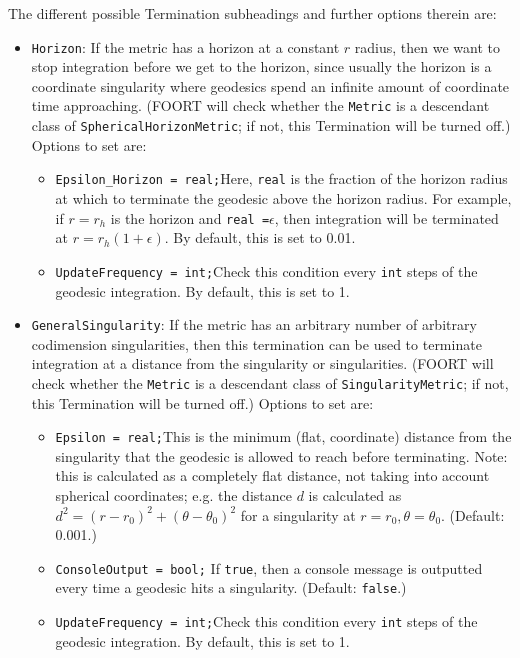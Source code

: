 \documentclass[11pt,a4paper]{article}
\newcommand{\code}[1]{{\tt #1}}
\begin{document}
The different possible Termination subheadings and further options therein are:
\begin{itemize}
 \item \code{Horizon}: If the metric has a horizon at a constant $r$ radius, then we want to stop integration before we get to the horizon, since usually the horizon is a coordinate singularity where geodesics spend an infinite amount of coordinate time approaching. (FOORT will check whether the \code{Metric} is a descendant class of \code{SphericalHorizonMetric}; if not, this Termination will be turned off.) Options to set are:
 \begin{itemize}
 \item \code{Epsilon\_Horizon = real;}\newline Here, \code{real} is the fraction of the horizon radius at which to terminate the geodesic above the horizon radius. For example, if $r=r_h$ is the horizon and \code{real =}$\epsilon$, then integration will be terminated at $r=r_h(1+\epsilon)$. By default, this is set to 0.01.
 \item \code{UpdateFrequency = int;}\newline Check this condition every \code{int} steps of the geodesic integration. By default, this is set to 1.
 \end{itemize}
 
  \item \code{GeneralSingularity}: If the metric has an arbitrary number of arbitrary codimension singularities, then this termination can be used to terminate integration at a distance from the singularity or singularities. (FOORT will check whether the \code{Metric} is a descendant class of \code{SingularityMetric}; if not, this Termination will be turned off.) Options to set are:
 \begin{itemize}
 \item \code{Epsilon = real;}\newline This is the minimum (flat, coordinate) distance from the singularity that the geodesic is allowed to reach before terminating. Note: this is calculated as a completely flat distance, not taking into account spherical coordinates; e.g. the distance $d$ is calculated as $d^2=(r-r_0)^2+(\theta-\theta_0)^2$ for a singularity at $r=r_0,\theta=\theta_0$. (Default: 0.001.)
 \item \code{ConsoleOutput = bool;} \newline If \code{true}, then a console message is outputted every time a geodesic hits a singularity. (Default: \code{false}.)
 \item \code{UpdateFrequency = int;}\newline Check this condition every \code{int} steps of the geodesic integration. By default, this is set to 1.
 \end{itemize}
 

\end{itemize}
\end{document}
